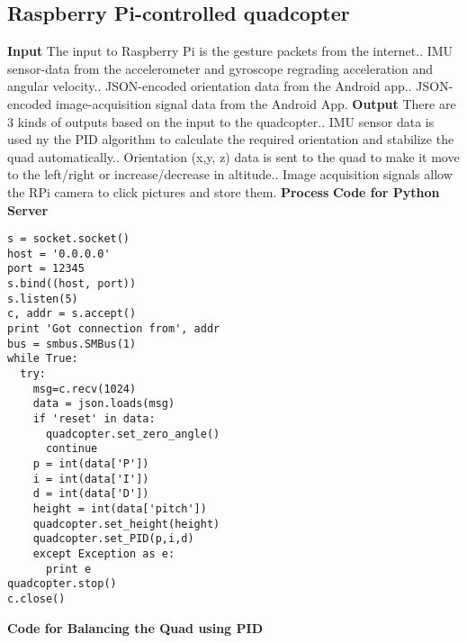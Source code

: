 \subsection{Raspberry Pi-controlled quadcopter}
\textbf{Input}\newline
The input to Raspberry Pi is the gesture packets from the internet.. IMU sensor-data from the accelerometer and gyroscope regrading acceleration and angular velocity.. JSON-encoded orientation data from the Android app.. JSON-encoded image-acquisition signal data from the Android App.\newline
\textbf{Output}\newline
There are 3 kinds of outputs based on the input to the quadcopter.. IMU sensor data is used ny the PID algorithm to calculate the required orientation and stabilize the quad automatically.. Orientation (x,y, z) data is sent to the quad to make it move to the left/right or increase/decrease in altitude.. Image acquisition signals allow the RPi camera to click pictures and store them.\newline
\textbf{Process}\newline
\textbf{Code for Python Server}\newline
\begin{lstlisting}
s = socket.socket()       
host = '0.0.0.0'      
port = 12345          
s.bind((host, port)) 
s.listen(5)          
c, addr = s.accept() 
print 'Got connection from', addr
bus = smbus.SMBus(1)
while True:
  try:
    msg=c.recv(1024)
    data = json.loads(msg)
    if 'reset' in data:
      quadcopter.set_zero_angle()
      continue
    p = int(data['P'])
    i = int(data['I'])
    d = int(data['D'])
    height = int(data['pitch'])
    quadcopter.set_height(height)
    quadcopter.set_PID(p,i,d)
    except Exception as e:
      print e
quadcopter.stop()
c.close()      
\end{lstlisting} 
\textbf{Code for Balancing the Quad using PID}\newline
